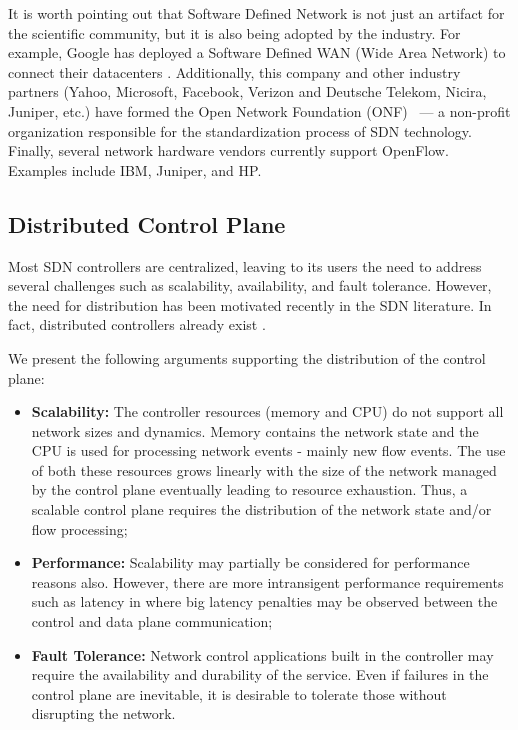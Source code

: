 It is worth pointing out that Software Defined Network is not just an  artifact for the scientific community, but it is also being adopted  by the industry. For example, Google has deployed a Software Defined  WAN (Wide Area Network) to connect their datacenters  \cite{Hoezle:2012uq}. 
Additionally, this company and other industry  partners (Yahoo, Microsoft, Facebook, Verizon and Deutsche Telekom,  Nicira, Juniper, etc.) have formed the Open Network Foundation (ONF)~\cite{onf} --- a non-profit organization  responsible for the  standardization process of SDN technology. 
Finally, several network  hardware vendors currently support OpenFlow.
Examples  include IBM, Juniper, and HP. 

\subsection{Distributed Control Plane}
Most SDN controllers are centralized, leaving to its users the need to address several challenges such as scalability, availability, and fault tolerance.
However, the need for distribution has been motivated recently in the SDN literature. 
In fact, distributed controllers already exist \distcontrollers.  

We present the following arguments supporting the distribution of the control plane: 

\begin{itemize}
\item[] \textbf{Scalability:}  The controller resources (memory and CPU) do not support all network sizes and dynamics.  Memory contains the network state and the CPU is used for processing network events - mainly new flow events. The use of both these resources grows linearly with the size of the network managed by the control plane eventually leading to  resource exhaustion. Thus, a scalable control plane requires the distribution of the network state and/or flow processing; 
\item[] \textbf{Performance:}  Scalability may partially be considered for performance reasons also. However, there are more intransigent performance requirements such as latency in  where big latency penalties may be observed between the  control and data plane  communication; 
\item[] \textbf{Fault Tolerance:} Network control applications built in the controller  may require the availability and durability of the service. Even if failures in the control plane are inevitable, it is desirable to tolerate those without disrupting the network. 
\end{itemize}

